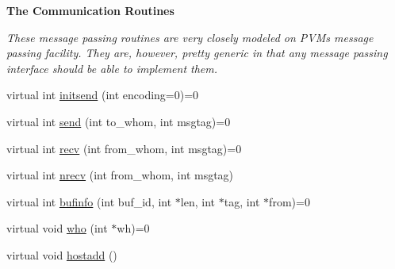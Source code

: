 \begin{Indent}\textbf{ The Communication Routines}\par
{\em These message passing routines are very closely modeled on P\+VM\textquotesingle{}s message passing facility. They are, however, pretty generic in that any message passing interface should be able to implement them. }\begin{DoxyCompactItemize}
\item 
virtual int \hyperlink{classMWRMComm_a12c2add8bea8577d5d150c49c7d42e5d}{initsend} (int encoding=0)=0
\item 
virtual int \hyperlink{classMWRMComm_abfe166a1b1c70e35069fbc0f1beb250f}{send} (int to\+\_\+whom, int msgtag)=0
\item 
virtual int \hyperlink{classMWRMComm_a9f10630a68baee310e48d0df33fb2dd8}{recv} (int from\+\_\+whom, int msgtag)=0
\item 
virtual int \hyperlink{classMWRMComm_a96b1eb6dd9c1d3f25ae63ac375f7206c}{nrecv} (int from\+\_\+whom, int msgtag)
\item 
virtual int \hyperlink{classMWRMComm_a7670401dc33950de354e41183dd392cd}{bufinfo} (int buf\+\_\+id, int $\ast$len, int $\ast$tag, int $\ast$from)=0
\item 
virtual void \hyperlink{classMWRMComm_acb947438d2447b15a0d621392802ff2e}{who} (int $\ast$wh)=0
\item 
virtual void \hyperlink{classMWRMComm_a8cc7e0fa6b024fe7441fca581b4edf83}{hostadd} ()
\end{DoxyCompactItemize}
\end{Indent}
